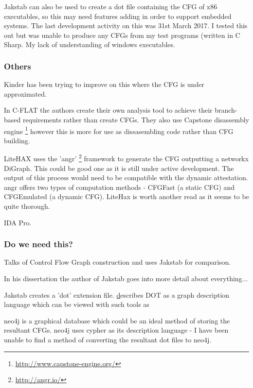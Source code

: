 Jakstab \cite{Kinder2008} can also be used to create a dot file containing the CFG of x86 executables, so this may need features adding in order to support embedded systems. The last development activity on this was 31st March 2017. I tested this out but was unable to produce any CFGs from my test programs (written in C Sharp. My lack of understanding of windows executables. 

\subsubsection{Others}

Kinder \cite{Kinder2012} has been trying to improve on this where the CFG is under approximated.

In C-FLAT \cite{Abera2016} the authors create their own analysis tool to achieve their branch-based requirements rather than create CFGs. They also use Capstone disassembly engine \footnote{\url{http://www.capstone-engine.org/}} however this is more for use as dissasembling code rather than CFG building.

LiteHAX \cite{Dessouky2018} uses the 'angr' \footnote{\url{http://angr.io/}} \cite{Shoshitaishvili2016} framework to generate the CFG outputting a networkx DiGraph. This could be good one as it is still under active development. The output of this process would need to be compatible with the dynamic attestation. angr offers two types of computation methods - CFGFast (a static CFG) and CFGEmulated (a dynamic CFG). LiteHax is worth another read as it seems to be quite thorough.

IDA Pro. 

\subsubsection{Do we need this?}
\cite{Nguyen2013} Talks of Control Flow Graph construction and uses Jakstab \cite{Kinder2008} for comparison. 


In his dissertation \cite{Kinder2010} the author of Jakstab goes into more detail about everything...

Jakstab creates a 'dot' extension file. \href{https://en.wikipedia.org/wiki/DOT_(graph_description_language)} describes DOT as a graph description language which can be viewed with such tools as 

neo4j is a graphical database which could be an ideal method of storing the resultant CFGs. neo4j uses cypher as its description language - I have been unable to find a method of converting the resultant dot files to neo4j.